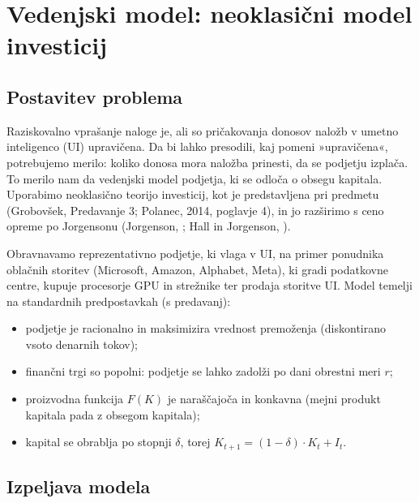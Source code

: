 \documentclass[12pt,a4paper]{article}
\begin{document}
\section{Vedenjski model: neoklasični model investicij}

\subsection{Postavitev problema}

Raziskovalno vprašanje naloge je, ali so pričakovanja donosov naložb v umetno inteligenco (UI) upravičena. Da bi lahko presodili, kaj pomeni »upravičena«, potrebujemo merilo: koliko donosa mora naložba prinesti, da se podjetju izplača. To merilo nam da vedenjski model podjetja, ki se odloča o obsegu kapitala. Uporabimo neoklasično teorijo investicij, kot je predstavljena pri predmetu (Grobovšek, Predavanje 3; Polanec, 2014, poglavje 4), in jo razširimo s ceno opreme po Jorgensonu (Jorgenson, \citeyear{Jorgenson1963}; Hall in Jorgenson, \citeyear{HallJorgenson1967}).

Obravnavamo reprezentativno podjetje, ki vlaga v UI, na primer ponudnika oblačnih storitev (Microsoft, Amazon, Alphabet, Meta), ki gradi podatkovne centre, kupuje procesorje GPU in strežnike ter prodaja storitve UI. Model temelji na standardnih predpostavkah (s predavanj):

\begin{itemize}
\item podjetje je racionalno in maksimizira vrednost premoženja (diskontirano vsoto denarnih tokov);
\item finančni trgi so popolni: podjetje se lahko zadolži po dani obrestni meri $r$;
\item proizvodna funkcija $F(K)$ je naraščajoča in konkavna (mejni produkt kapitala pada z obsegom kapitala);
\item kapital se obrablja po stopnji $\delta$, torej $K_{t+1} = (1 - \delta) \cdot K_t + I_t$.
\end{itemize}

\subsection{Izpeljava modela}
\end{document}
